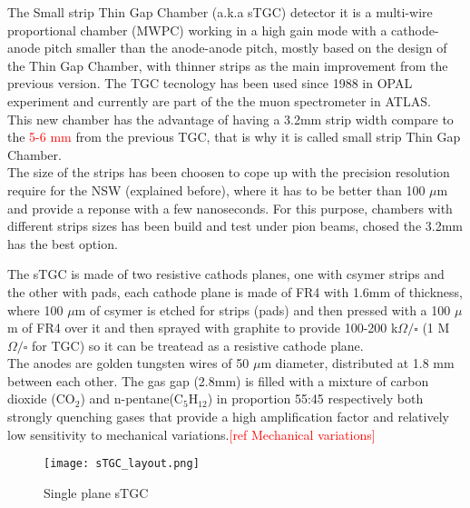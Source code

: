 The Small strip Thin Gap Chamber (a.k.a sTGC) detector it is a multi-wire proportional chamber (MWPC)  working in a high gain mode with a cathode-anode pitch smaller than the anode-anode pitch, mostly based on the design of the Thin Gap Chamber\cite{tgc}, with thinner strips as the main improvement from the previous version. The TGC tecnology has been used since 1988 in OPAL experiment and currently are part of the the muon spectrometer in ATLAS. \\
	This new  chamber has the advantage of having a 3.2mm strip width compare to the \textcolor{red}{5-6 mm} from the previous TGC, that is why it is called small strip Thin Gap Chamber.\\ 
	The size of the strips has been choosen to cope up with the precision resolution require for the NSW (explained before), where it has to be better than 100 $\mu$m and provide a reponse with a few nanoseconds. For this purpose, chambers with different strips sizes has been build and test under pion beams, chosed the 3.2mm has the best option\cite{stripwidth}. \par

The sTGC is made of two resistive cathods planes, one with csymer strips and the other with pads, each cathode plane is made of FR4 with 1.6mm of thickness, where  100
$\mu$m of csymer is etched for strips (pads) and then pressed with a 100 $\mu$m of FR4 over it and then sprayed with
graphite to provide 100-200 k$\Omega / \square$ (1 M$\Omega/\square$ for TGC) so it can be treatead as a resistive cathode plane.\\
The anodes are golden tungsten wires of 50 $\mu$m diameter, distributed at 1.8 mm between each other. The gas gap (2.8mm) is filled with a mixture of carbon dioxide (CO$_2$) and n-pentane(C$_5$H$_12$) in proportion 55:45 respectively both
strongly quenching gases that provide a high amplification factor and relatively low sensitivity to mechanical variations.\textcolor{red}{[ref Mechanical
variations]}\\  



\begin{figure}[h]
		\centering
		\texttt{[image: sTGC\_layout.png]}
		\caption{Single plane sTGC}\label{fig:sTGC}
\end{figure}

